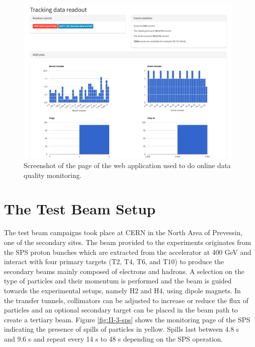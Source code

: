       \begin{figure}[h!]
        \centering
        \includegraphics[width=\textwidth]{img/II-3-test-beam/app-tk.png}
        \caption{Screenshot of the page of the web application used to do online data quality monitoring.}
        \label{fig:II-3-app-tk}
      \end{figure}

  \section{The Test Beam Setup}

    The test beam campaigns took place at CERN in the North Area of Prevessin, one of the secondary sites. The beam provided to the experiments originates from the SPS proton bunches which are extracted from the accelerator at 400 GeV and interact with four primary targets (T2, T4, T6, and T10) to produce the secondary beams mainly composed of electrons and hadrons. A selection on the type of particles and their momentum is performed and the beam is guided towards the experimental setups, namely H2 and H4, using dipole magnets. In the transfer tunnels, collimators can be adjusted to increase or reduce the flux of particles and an optional secondary target can be placed in the beam path to create a tertiary beam. Figure \ref{fig:II-3-sps} shows the monitoring page of the SPS indicating the presence of spills of particles in yellow. Spills last between 4.8 s and 9.6 s and repeat every 14 s to 48 s depending on the SPS operation. \\

